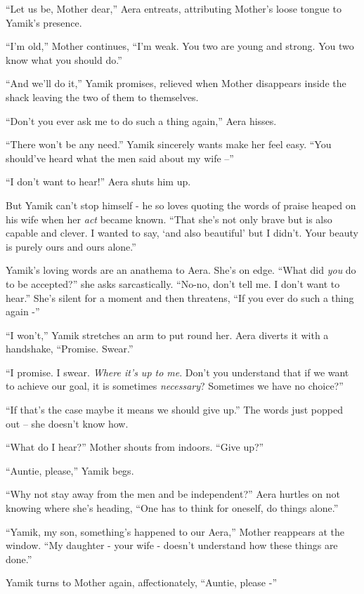 \documentclass[twoside,11pt]{book}
\begin{document}
``Let us be, Mother dear,'' Aera entreats, attributing Mother's loose tongue to Yamik's
presence.

``I'm old,'' Mother continues, ``I'm weak. You two are young and strong. You two
know what you should do.''

``And we'll do it,'' Yamik promises, relieved when Mother disappears inside the shack leaving
the two of them to themselves.

``Don't you ever ask me to do such a thing again,'' Aera hisses.

``There won't be any need.'' Yamik sincerely wants make her feel easy. ``You
should've heard what the men said about my wife --''

``I don't want to hear!'' Aera shuts him up.

But Yamik can't stop himself - he so loves quoting the words of praise heaped on his wife when her \textit{act} became
known. ``That she's not only brave but is also capable and clever. I wanted to say, `and also beautiful'
but I didn't. Your beauty is purely ours and ours alone.''

Yamik's loving words are an anathema to Aera. She's on edge. ``What did \textit{you} do to be
accepted?'' she asks sarcastically. ``No-no, don't tell me. I don't want to
hear.'' She's silent for a moment and then threatens, ``If you ever do such a thing again
-''

``I won't,'' Yamik stretches an arm to put round her. Aera diverts it with a handshake,
``Promise. Swear.''

``I promise. I swear. \textit{Where it's up to me}. Don't you understand that if we want to achieve our
goal, it is sometimes \textit{necessary}? Sometimes we have no choice?''

``If that's the case maybe it means we should give up.'' The words just popped out -- she
doesn't know how.

``What do I hear?'' Mother shouts from indoors. ``Give up?''

``Auntie, please,'' Yamik begs.

``Why not stay away from the men and be independent?'' Aera hurtles on not knowing where she's heading,
``One has to think for oneself, do things alone.''

``Yamik, my son, something's happened to our Aera,'' Mother reappears at the window.
``My daughter - your wife - doesn't understand how these things are done.''

Yamik turns to Mother again, affectionately, ``Auntie, please -''
\end{document}
